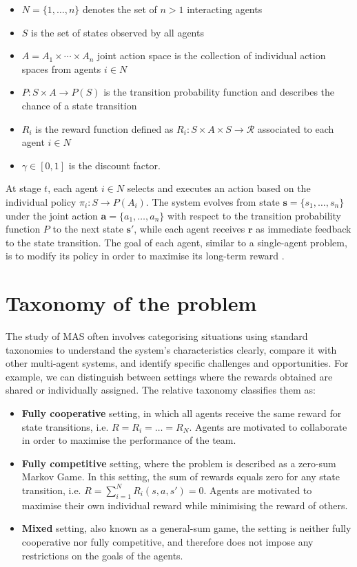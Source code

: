 \documentclass[a4paper,singleside,12pt]{report} %
\begin{document}
\begin{itemize}
\item
  \(N = \{1, \dots, n\}\) denotes the set of \(n > 1\) interacting agents
\item
  \(S\) is the set of states observed by all agents
\item
  \(A = A_1 \times \cdots \times A_n\) joint action space is the
  collection of individual action spaces from agents \(i \in N\)
\item
  \(P: S \times A \rightarrow P(S)\) is the transition probability
  function and describes the chance of a state transition
\item
  \(R_i\) is the reward function defined as
  \(R_i: S \times A \times S \rightarrow \mathcal{R}\) associated to each
  agent \(i \in N\)
\item
  \(\gamma \in [0,1]\) is the discount factor.
\end{itemize}

At stage \(t\), each agent \(i \in N\) selects and executes an action based on the individual policy \(\pi_i: S \rightarrow P(A_i)\). The system evolves from state \(\textbf{s} = \{s_1, \dots, s_n\}\) under the joint action \(\textbf{a} = \{a_1, \dots, a_n\}\) with respect to the transition probability function \(P\) to the next state \(\textbf{s}'\), while each agent receives \(\textbf{r}\) as immediate feedback to the state transition. The goal of each agent, similar to a single-agent problem, is to modify its policy in order to maximise its long-term reward \cite{Rao2000ReinforcementLA}.

\section{Taxonomy of the problem}\label{taxonomy-of-the-problem}
The study of MAS often involves categorising situations using standard taxonomies to understand the system's characteristics clearly, compare it with other multi-agent systems, and identify specific challenges and opportunities. For example, we can distinguish between settings where the rewards obtained are shared or individually assigned. The relative taxonomy classifies them as:

\begin{itemize}
\item \textbf{Fully cooperative} setting, in which all agents receive the same reward for state transitions, i.e. $R = R_i = \dots = R_N$. Agents are motivated to collaborate in order to maximise the performance of the team.
\item \textbf{Fully competitive} setting, where the problem is described as a zero-sum Markov Game. In this setting, the sum of rewards equals zero for any state transition, i.e. $R = \sum_{i=1}^N R_i(s, a, s') = 0$. Agents are motivated to maximise their own individual reward while minimising the reward of others.
\item \textbf{Mixed} setting, also known as a general-sum game, the setting is neither fully cooperative nor fully competitive, and therefore does not impose any restrictions on the goals of the agents.
\end{itemize}
\end{document}
